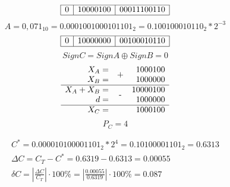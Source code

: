 \documentclass{article}
\begin{document}
\begin{enumerate}
$$\begin{array}{|c|c|c|}
                            \hline        
                            0 & 10000100 & 00011100110 \\\hline
                     \end{array}
              $$
              $$ A = 0,071_{10} = 0.0001001000101101_{2} = 0.100100010110_{2} * 2^{-3} $$
              $$
                     \begin{array}{|c|c|c|}
                            \hline        
                            0 & 10000000 & 00100010110 \\\hline
                     \end{array}
              $$
              $$ SignC = SignA \oplus SignB = 0 $$
              $$
                    \begin{array}{rcr}
                           X_A         = & \PLUS  & 1000100         \\
                           X_B         = &        & 1000000 \nl
                           X_A + X_B   = & \MINUS & 10000100        \\
                           d           = &        & 1000000     \nl
                           X_C         = &        & 1000100
                    \end{array}
             $$
             $$ P_C = 4 $$
              
              $$
                     \begin{array}{c}
                            C^* = 0.000010100001101_{2} * 2^4 = 0.10100001101_{2} = 0.6313\\
                            \Delta C = C_T - C^* = 0.6319 - 0.6313 = 0.00055 \\
                            \delta C = \left|\frac{\Delta C}{C_T}\right| \cdot 100\% = \left|\frac{0.00055}{0.6319}\right| \cdot 100\% = 0.087 \\
                     \end{array}
              $$
\end{enumerate}
\end{document}
